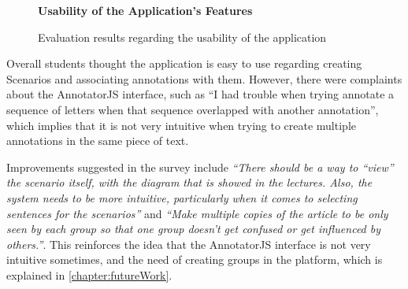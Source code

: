 \begin{figure}[h]
\centering
\begin{normalsize}
\textbf{Usability of the Application's Features}\\
\end{normalsize}
\scriptsize
{}
\caption{Evaluation results regarding the usability of the application}
\label{figure:usabilityEvaluation}
\end{figure}

Overall students thought the application is easy to use regarding creating Scenarios and associating annotations with them. However, there were complaints about the AnnotatorJS interface, such as ``I had trouble when trying annotate a sequence of letters when that sequence overlapped with another annotation'', which implies that it is not very intuitive when trying to create multiple annotations in the same piece of text.

Improvements suggested in the survey include \textit{``There should be a way to ``view'' the scenario itself, with the diagram that is showed in the lectures. Also, the system needs to be more intuitive, particularly when it comes to selecting sentences for the scenarios''} and \textit{``Make multiple copies of the article to be only seen by each group so that one group doesn't get confused or get influenced by others.''}. This reinforces the idea that the AnnotatorJS interface is not very intuitive sometimes, and the need of creating groups in the platform, which is explained in \ref{chapter:futureWork}.


